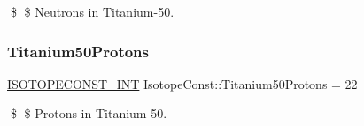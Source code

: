 \$ \$ Neutrons in Titanium-\/50. \mbox{\label{group___isotope_const-_titanium-_ti50_ga5084ab4a1070e145d9d53a9663b88e12}} 
\subsubsection{\texorpdfstring{Titanium50\+Protons}{Titanium50Protons}}
{\footnotesize\ttfamily \mbox{\hyperlink{group___isotope_const-_macros_ga5f18360b3e99483a35c32d789e62621c}{I\+S\+O\+T\+O\+P\+E\+C\+O\+N\+S\+T\+\_\+\+I\+NT}} Isotope\+Const\+::\+Titanium50\+Protons = 22}

\$ \$ Protons in Titanium-\/50. 